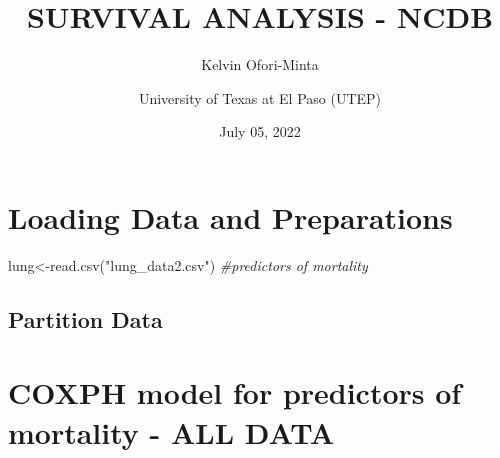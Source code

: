 \documentclass[
  11pt,
]{article}
\title{SURVIVAL ANALYSIS - NCDB}
\author{Kelvin Ofori-Minta \and University of Texas at El Paso (UTEP)}
\date{July 05, 2022}
\newenvironment{Shaded}{\begin{snugshade}}{\end{snugshade}}
\newcommand{\AttributeTok}[1]{\textcolor[rgb]{0.77,0.63,0.00}{#1}}
\newcommand{\CommentTok}[1]{\textcolor[rgb]{0.56,0.35,0.01}{\textit{#1}}}
\newcommand{\DecValTok}[1]{\textcolor[rgb]{0.00,0.00,0.81}{#1}}
\newcommand{\FloatTok}[1]{\textcolor[rgb]{0.00,0.00,0.81}{#1}}
\newcommand{\FunctionTok}[1]{\textcolor[rgb]{0.00,0.00,0.00}{#1}}
\newcommand{\NormalTok}[1]{#1}
\newcommand{\OtherTok}[1]{\textcolor[rgb]{0.56,0.35,0.01}{#1}}
\newcommand{\SpecialCharTok}[1]{\textcolor[rgb]{0.00,0.00,0.00}{#1}}
\newcommand{\StringTok}[1]{\textcolor[rgb]{0.31,0.60,0.02}{#1}}
\begin{document}
\maketitle

{
\setcounter{tocdepth}{4}
\tableofcontents
}
\newpage
\section{Loading Data and Preparations}

\begin{Shaded}
\begin{Highlighting}[]
\NormalTok{lung}\OtherTok{\textless{}{-}}\FunctionTok{read.csv}\NormalTok{(}\StringTok{"lung\_data2.csv"}\NormalTok{) }\CommentTok{\#predictors of mortality}
\end{Highlighting}
\end{Shaded}

\newpage
\subsection{Partition Data}

\begin{Shaded}
\end{Shaded}

\newpage
\section{COXPH model for predictors of mortality - ALL DATA}
\end{document}
